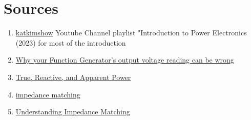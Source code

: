 \section{Sources}
\begin{enumerate}
    \item \href{https://www.youtube.com/watch?v=hRAyfJLZnC0&list=PLmK1EnKxphinxBub5hL0ZoJXWoqjkGE19}{katkimshow} Youtube Channel playlist "Introduction to Power Electronics (2023) for most of the introduction
    \item \href{https://www.youtube.com/watch?v=tClE8s6RZdg}{Why your Function Generator's output voltage reading can be wrong}
    \item \href{https://www.allaboutcircuits.com/textbook/alternating-current/chpt-11/true-reactive-and-apparent-power/}{True, Reactive, and Apparent Power}
    \item \href{https://www.analog.com/en/resources/glossary/impedance-matching.html}{impedance matching}
    \item \href{https://eepower.com/technical-articles/understanding-impedance-matching/#}{Understanding Impedance Matching}
\end{enumerate}